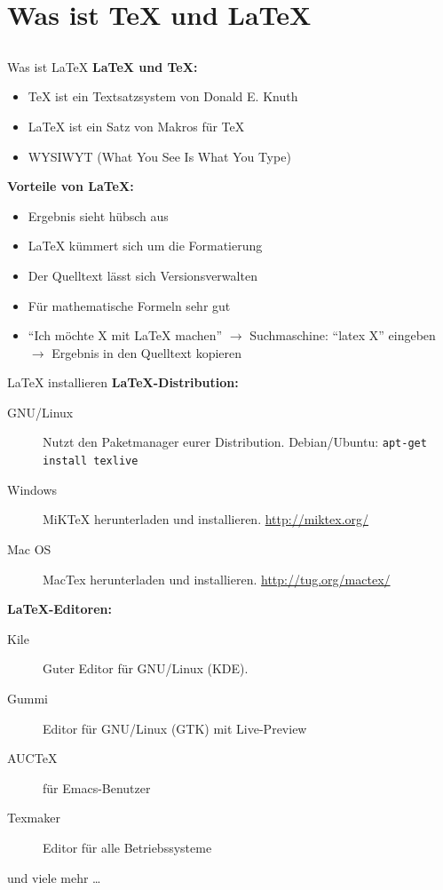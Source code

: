 \documentclass{beamer}
\begin{document}
	\section{Was ist \TeX{} und \LaTeX{}}
		\subsection*{}
		\begin{frame}{Was ist \LaTeX{}}
			\textbf{\LaTeX{} und \TeX{}:}
			\begin{itemize}
				\item \TeX{} ist ein Textsatzsystem von Donald E. Knuth
				\item \LaTeX{} ist ein Satz von Makros für \TeX
				\item WYSIWYT (What You See Is What You Type)
			\end{itemize}
			\vspace{0.2cm}
			\textbf{Vorteile von \LaTeX{}:}
			\begin{itemize}
				\item Ergebnis sieht hübsch aus
				\item \LaTeX{} kümmert sich um die Formatierung
				\item Der Quelltext lässt sich Versionsverwalten
				\item Für mathematische Formeln sehr gut
				\item ``Ich möchte X mit \LaTeX{} machen'' $\rightarrow$
				Suchmaschine: ``latex X'' eingeben $\rightarrow$
				Ergebnis in den Quelltext kopieren
			\end{itemize}
		\end{frame}
		
		
		\begin{frame}{\LaTeX{} installieren}
			\textbf{\LaTeX-Distribution:}
			\begin{description}
				\item[GNU/Linux] Nutzt den Paketmanager eurer Distribution. Debian/Ubuntu: \texttt{apt-get install texlive} 
				\item[Windows] MiKTeX herunterladen und installieren. \url{http://miktex.org/}
				\item[Mac OS] MacTex herunterladen und installieren. \url{http://tug.org/mactex/} 
			\end{description}
			\textbf{\LaTeX-Editoren:}
			\begin{description}
				\item[Kile] Guter Editor für GNU/Linux (KDE).
				\item[Gummi] Editor für GNU/Linux (GTK) mit Live-Preview
				\item[AUCTeX] für Emacs-Benutzer
				\item[Texmaker] Editor für alle Betriebssysteme
			\end{description}
			 und viele mehr \dots
		\end{frame}
		
\end{document}
